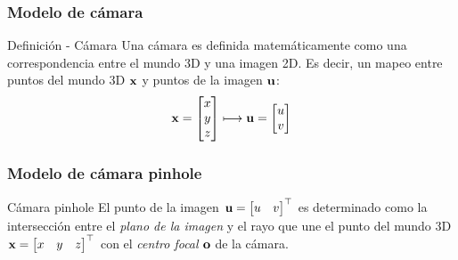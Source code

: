 \documentclass[compress]{beamer}
\begin{document}
\begin{frame}
\frametitle{Modelo de cámara}

\begin{block}{Definición - Cámara}
Una cámara es definida matemáticamente como una correspondencia entre el mundo 3D y una imagen 2D. Es decir, un mapeo entre puntos del mundo 3D $\boldsymbol{\mathbf{x}}$ y puntos de la imagen $\boldsymbol{\mathbf{u}}$:
\begin{equation}
\boldsymbol{\mathbf{x}}=\begin{bmatrix}x\\
y\\
z
\end{bmatrix}\longmapsto
\boldsymbol{\mathbf{u}}=\begin{bmatrix}u\\
v
\end{bmatrix}
\end{equation}
\end{block}

\end{frame}


\begin{frame}
\frametitle{Modelo de cámara pinhole}

\begin{block}{Cámara pinhole}
El punto de la imagen $\boldsymbol{\mathbf{u}}=\begin{bmatrix}u & v\end{bmatrix}^{\top}$ es determinado como la intersección entre el \emph{plano de la imagen} y el rayo que une el punto del mundo 3D $\boldsymbol{\mathbf{x}}=\begin{bmatrix}x & y & z\end{bmatrix}^{\top}$ con el \emph{centro focal} $\boldsymbol{\mathbf{o}}$ de la cámara.
\end{block}

\begin{figure}[!htb]
	\centering
	\hfill
\end{figure}

\end{frame}
\end{document}
